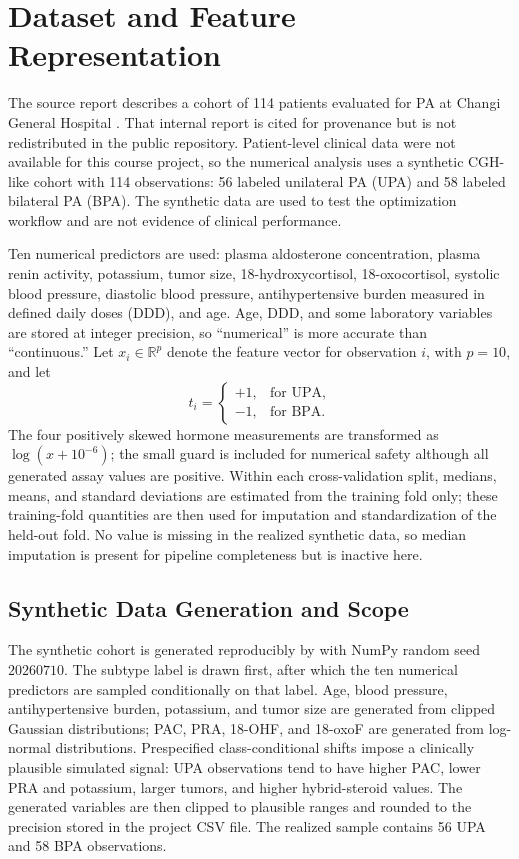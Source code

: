 \documentclass[11pt,a4paper]{article}
\numberwithin{equation}{section} %
\begin{document}
\section{Dataset and Feature Representation}

The source report describes a cohort of 114 patients evaluated for PA at Changi General Hospital \cite{cghmidterm}. That internal report is cited for provenance but is not redistributed in the public repository. Patient-level clinical data were not available for this course project, so the numerical analysis uses a synthetic CGH-like cohort with 114 observations: 56 labeled unilateral PA (UPA) and 58 labeled bilateral PA (BPA). The synthetic data are used to test the optimization workflow and are not evidence of clinical performance.

Ten numerical predictors are used: plasma aldosterone concentration, plasma renin activity, potassium, tumor size, 18-hydroxycortisol, 18-oxocortisol, systolic blood pressure, diastolic blood pressure, antihypertensive burden measured in defined daily doses (DDD), and age. Age, DDD, and some laboratory variables are stored at integer precision, so ``numerical'' is more accurate than ``continuous.'' Let $x_i\in\mathbb{R}^p$ denote the feature vector for observation $i$, with $p=10$, and let
\begin{equation}
    t_i =
    \begin{cases}
        +1, & \text{for UPA},\\
        -1, & \text{for BPA}.
    \end{cases}
\end{equation}
The four positively skewed hormone measurements are transformed as $\log(x+10^{-6})$; the small guard is included for numerical safety although all generated assay values are positive. Within each cross-validation split, medians, means, and standard deviations are estimated from the training fold only; these training-fold quantities are then used for imputation and standardization of the held-out fold. No value is missing in the realized synthetic data, so median imputation is present for pipeline completeness but is inactive here.

\subsection{Synthetic Data Generation and Scope}

The synthetic cohort is generated reproducibly by
 with NumPy random seed
$20260710$. The subtype label is drawn first, after which the ten numerical
predictors are sampled conditionally on that label. Age, blood pressure,
antihypertensive burden, potassium, and tumor size are generated from clipped
Gaussian distributions; PAC, PRA, 18-OHF, and 18-oxoF are generated from
log-normal distributions. Prespecified class-conditional shifts impose a
clinically plausible simulated signal: UPA observations tend to have higher
PAC, lower PRA and potassium, larger tumors, and higher hybrid-steroid values.
The generated variables are then clipped to plausible ranges and rounded to
the precision stored in the project CSV file. The realized sample contains 56
UPA and 58 BPA observations.
\end{document}
